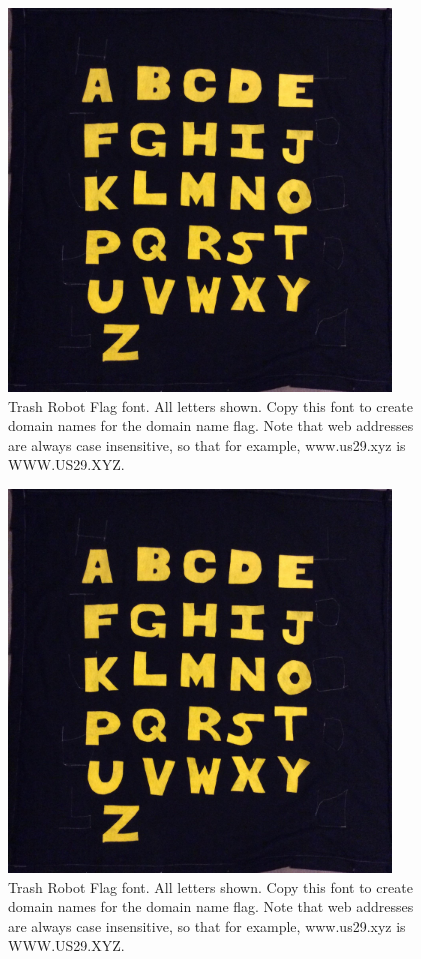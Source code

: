 \begin{figure}
	\centering
	\includegraphics[width=4in]{figures/trashrobot/alphabet.jpg}
	\caption[alphabet]
	{Trash Robot Flag font. All letters shown.  Copy this font to create domain names for the domain name flag.  Note that web addresses are always case insensitive, so that for example, www.us29.xyz is WWW.US29.XYZ.}
\end{figure}


\begin{figure}
	\centering
	\includegraphics[width=4in]{figures/trashrobot/alphabet.jpg}
	\caption[alphabet]
	{Trash Robot Flag font. All letters shown.  Copy this font to create domain names for the domain name flag.  Note that web addresses are always case insensitive, so that for example, www.us29.xyz is WWW.US29.XYZ.}
\end{figure}

